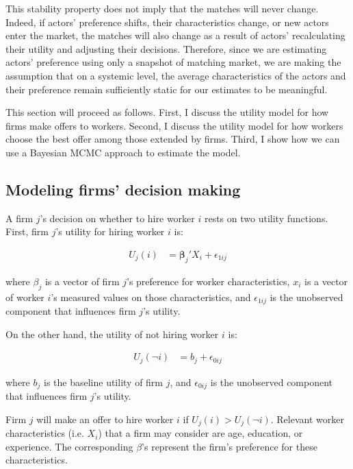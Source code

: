 This stability property does not imply that the matches will never change.
Indeed, if actors' preference shifts, their characteristics change, or new
actors enter the market, the matches will also change as a result of actors'
recalculating their utility and adjusting their decisions. Therefore, since we
are estimating actors' preference using only a snapshot of matching market, we
are making the assumption that on a systemic level, the average characteristics
of the actors and their preference remain sufficiently static for our estimates
to be meaningful.

This section will proceed as follows. First, I discuss the utility model for how
firms make offers to workers. Second, I discuss the utility model for how
workers choose the best offer among those extended by firms. Third, I show how
we can use a Bayesian MCMC approach to estimate the model.

\subsection{Modeling firms' decision making}
\label{sec:model_firm_decision_making}

A firm $j$'s decision on whether to hire worker $i$ rests on two utility
functions. First, firm $j$'s utility for hiring worker $i$ is:

\begin{align}
  U_j(i) &= \bm{\beta}_j' X_i + \epsilon_{1ij}
\end{align}

where $\beta_j$ is a vector of firm $j$'s preference for worker characteristics,
$x_i$ is a vector of worker $i$'s measured values on those characteristics, and
$\epsilon_{1ij}$ is the unobserved component that influences firm $j$'s utility.

On the other hand, the utility of not hiring worker $i$ is:

\begin{align}
  U_j(\neg i) &= b_j + \epsilon_{0ij}
\end{align}

where $b_j$ is the baseline utility of firm $j$, and $\epsilon_{0ij}$ is the
unobserved component that influences firm $j$'s utility.

Firm $j$ will make an offer to hire worker $i$ if $U_j(i) > U_j(\neg i)$.
Relevant worker characteristics (i.e. $X_i$) that a firm may consider are age,
education, or experience. The corresponding $\beta$'s represent the firm's
preference for these characteristics.

